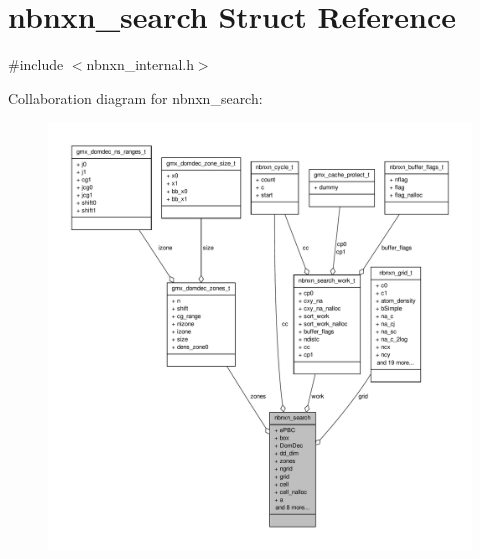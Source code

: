 \hypertarget{structnbnxn__search}{\section{nbnxn\-\_\-search \-Struct \-Reference}
\label{structnbnxn__search}
}


{\ttfamily \#include $<$nbnxn\-\_\-internal.\-h$>$}



\-Collaboration diagram for nbnxn\-\_\-search\-:
\nopagebreak
\begin{figure}[H]
\begin{center}
\leavevmode
\includegraphics[width=350pt]{structnbnxn__search__coll__graph}
\end{center}
\end{figure}
